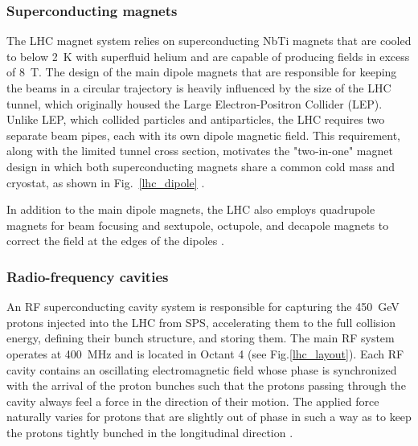 \subsubsection{Superconducting magnets}
The LHC magnet system relies on superconducting NbTi magnets that are cooled to below \SI{2}{\K} with superfluid helium and are capable of producing fields in excess of \SI{8}{\tesla}. The design of the main dipole magnets that are responsible for keeping the beams in a circular trajectory is heavily influenced by the size of the LHC tunnel, which originally housed the Large Electron-Positron Collider (LEP). Unlike LEP, which collided particles and antiparticles, the LHC requires two separate beam pipes, each with its own dipole magnetic field. This requirement, along with the limited tunnel cross section, motivates the "two-in-one" magnet design in which both superconducting magnets share a common cold mass and cryostat, as shown in Fig.~\ref{lhc_dipole} \cite{lhc_machine}.

In addition to the main dipole magnets, the LHC also employs quadrupole magnets for beam focusing and sextupole, octupole, and decapole magnets to correct the field at the edges of the dipoles \cite{lhc_machine}.



\subsubsection{Radio-frequency cavities}
An RF superconducting cavity system is responsible for capturing the \SI{450}{\GeV} protons injected into the LHC from SPS, accelerating them to the full collision energy, defining their bunch structure, and storing them. The main RF system operates at \SI{400}{\MHz} and is located in Octant 4 (see Fig.\ref{lhc_layout}). Each RF cavity contains an oscillating electromagnetic field whose phase is synchronized with the arrival of the proton bunches such that the protons passing through the cavity always feel a force in the direction of their motion. The applied force naturally varies for protons that are slightly out of phase in such a way as to keep the protons tightly bunched in the longitudinal direction \cite{lhc_machine}.
